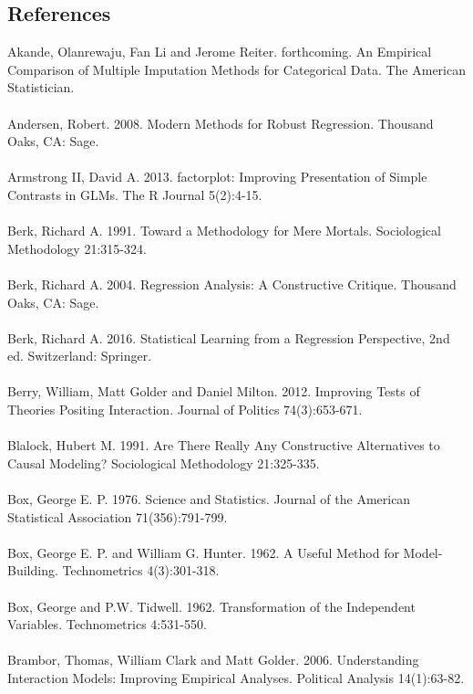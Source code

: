 \documentclass[letterpaper]{article}
\begin{document}
\subsection*{References}
Akande, Olanrewaju, Fan Li and Jerome Reiter. forthcoming. An Empirical Comparison of Multiple Imputation Methods for Categorical Data. The American Statistician.
\\
\\
Andersen, Robert. 2008. Modern Methods for Robust Regression. Thousand Oaks, CA: Sage.
\\
\\
Armstrong II, David A. 2013. factorplot: Improving Presentation of Simple Contrasts in GLMs. The R Journal 5(2):4-15.
\\
\\
Berk, Richard A. 1991. Toward a Methodology for Mere Mortals. Sociological Methodology 21:315-324.
\\
\\
Berk, Richard A. 2004. Regression Analysis: A Constructive Critique. Thousand Oaks, CA: Sage.
\\
\\
Berk, Richard A. 2016. Statistical Learning from a Regression Perspective, 2nd ed. Switzerland: Springer.
\\
\\
Berry, William, Matt Golder and Daniel Milton. 2012. Improving Tests of Theories Positing Interaction. Journal of Politics 74(3):653-671.
\\
\\
Blalock, Hubert M. 1991. Are There Really Any Constructive Alternatives to Causal Modeling? Sociological Methodology 21:325-335.
\\
\\
Box, George E. P. 1976. Science and Statistics. Journal of the American Statistical Association 71(356):791-799.
\\
\\
Box, George E. P. and William G. Hunter. 1962. A Useful Method for Model-Building. Technometrics 4(3):301-318.
\\
\\
Box, George and P.W. Tidwell. 1962. Transformation of the Independent Variables. Technometrics 4:531-550.
\\
\\
Brambor, Thomas, William Clark and Matt Golder. 2006. Understanding Interaction Models: Improving Empirical Analyses. Political Analysis 14(1):63-82.
\\
\\
\end{document}

